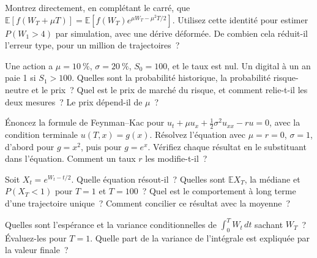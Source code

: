 \begin{question}\label{iq:iv1:stochastic-calculus:17}
Montrez directement, en complétant le carré, que $\mathbb{E}[f(W_T + \mu T)] = \mathbb{E}[f(W_T)e^{\mu W_T - \mu^2T/2}]$. Utilisez cette identité pour estimer $P(W_1 > 4)$ par simulation, avec une dérive déformée. De combien cela réduit-il l'erreur type, pour un million de trajectoires~?
\end{question}

\begin{question}\label{iq:iv1:stochastic-calculus:18}
Une action a $\mu = 10~\%$, $\sigma = 20~\%$, $S_0 = 100$, et le taux est nul. Un digital à un an paie 1 si $S_1 > 100$. Quelles sont la probabilité historique, la probabilité risque-neutre et le prix~? Quel est le prix de marché du risque, et comment relie-t-il les deux mesures~? Le prix dépend-il de $\mu$~?
\end{question}

\begin{question}\label{iq:iv1:stochastic-calculus:19}
Énoncez la formule de Feynman--Kac pour $u_t + \mu u_x + \frac12\sigma^2u_{xx} - ru = 0$, avec la condition terminale $u(T, x) = g(x)$. Résolvez l'équation avec $\mu = r = 0$, $\sigma = 1$, d'abord pour $g = x^2$, puis pour $g = e^x$. Vérifiez chaque résultat en le substituant dans l'équation. Comment un taux $r$ les modifie-t-il~?
\end{question}

\begin{question}\label{iq:iv1:stochastic-calculus:20}
Soit $X_t = e^{W_t - t/2}$. Quelle équation résout-il~? Quelles sont $\mathbb{E}X_T$, la médiane et $P(X_T < 1)$ pour $T = 1$ et $T = 100$~? Quel est le comportement à long terme d'une trajectoire unique~? Comment concilier ce résultat avec la moyenne~?
\end{question}

\begin{question}\label{iq:iv1:stochastic-calculus:21}
Quelles sont l'espérance et la variance conditionnelles de $\int_0^TW_t\,dt$ sachant $W_T$~? Évaluez-les pour $T = 1$. Quelle part de la variance de l'intégrale est expliquée par la valeur finale~?
\end{question}

